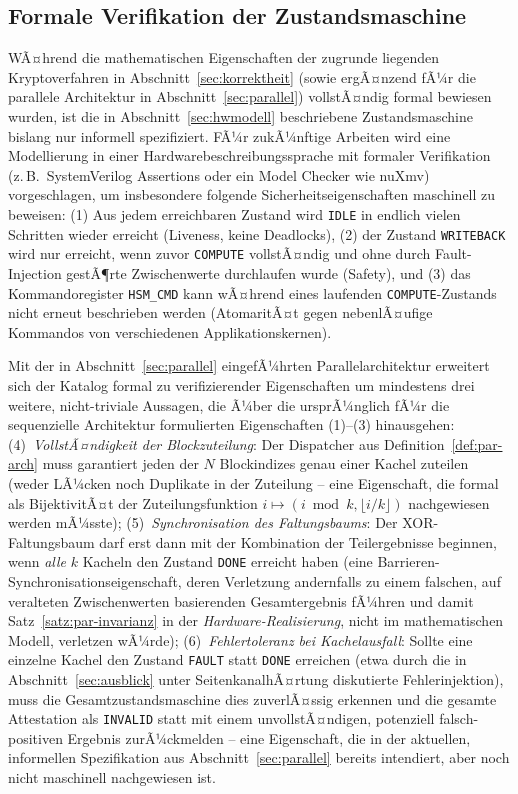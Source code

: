 ﻿\documentclass[a4paper,12pt]{article}
\theoremstyle{definition}
\begin{document}
\subsection{Formale Verifikation der Zustandsmaschine}

WÃ¤hrend die mathematischen Eigenschaften der zugrunde liegenden Kryptoverfahren in Abschnitt~\ref{sec:korrektheit} (sowie ergÃ¤nzend fÃ¼r die parallele Architektur in Abschnitt~\ref{sec:parallel}) vollstÃ¤ndig formal bewiesen wurden, ist die in Abschnitt~\ref{sec:hwmodell} beschriebene Zustandsmaschine bislang nur informell spezifiziert. FÃ¼r zukÃ¼nftige Arbeiten wird eine Modellierung in einer Hardwarebeschreibungssprache mit formaler Verifikation (z.\,B.\ SystemVerilog Assertions oder ein Model Checker wie nuXmv) vorgeschlagen, um insbesondere folgende Sicherheitseigenschaften maschinell zu beweisen: (1) Aus jedem erreichbaren Zustand wird \texttt{IDLE} in endlich vielen Schritten wieder erreicht (Liveness, keine Deadlocks), (2) der Zustand \texttt{WRITEBACK} wird nur erreicht, wenn zuvor \texttt{COMPUTE} vollstÃ¤ndig und ohne durch Fault-Injection gestÃ¶rte Zwischenwerte durchlaufen wurde (Safety), und (3) das Kommandoregister \texttt{HSM\_CMD} kann wÃ¤hrend eines laufenden \texttt{COMPUTE}-Zustands nicht erneut beschrieben werden (AtomaritÃ¤t gegen nebenlÃ¤ufige Kommandos von verschiedenen Applikationskernen).

Mit der in Abschnitt~\ref{sec:parallel} eingefÃ¼hrten Parallelarchitektur erweitert sich der Katalog formal zu verifizierender Eigenschaften um mindestens drei weitere, nicht-triviale Aussagen, die Ã¼ber die ursprÃ¼nglich fÃ¼r die sequenzielle Architektur formulierten Eigenschaften (1)--(3) hinausgehen: (4)~\emph{VollstÃ¤ndigkeit der Blockzuteilung}: Der Dispatcher aus Definition~\ref{def:par-arch} muss garantiert jeden der $N$ Blockindizes genau einer Kachel zuteilen (weder LÃ¼cken noch Duplikate in der Zuteilung -- eine Eigenschaft, die formal als BijektivitÃ¤t der Zuteilungsfunktion $i \mapsto (i \bmod k, \lfloor i/k\rfloor)$ nachgewiesen werden mÃ¼sste); (5)~\emph{Synchronisation des Faltungsbaums}: Der XOR-Faltungsbaum darf erst dann mit der Kombination der Teilergebnisse beginnen, wenn \emph{alle} $k$ Kacheln den Zustand \texttt{DONE} erreicht haben (eine Barrieren-Synchronisationseigenschaft, deren Verletzung andernfalls zu einem falschen, auf veralteten Zwischenwerten basierenden Gesamtergebnis fÃ¼hren und damit Satz~\ref{satz:par-invarianz} in der \emph{Hardware-Realisierung}, nicht im mathematischen Modell, verletzen wÃ¼rde); (6)~\emph{Fehlertoleranz bei Kachelausfall}: Sollte eine einzelne Kachel den Zustand \texttt{FAULT} statt \texttt{DONE} erreichen (etwa durch die in Abschnitt~\ref{sec:ausblick} unter SeitenkanalhÃ¤rtung diskutierte Fehlerinjektion), muss die Gesamtzustandsmaschine dies zuverlÃ¤ssig erkennen und die gesamte Attestation als \texttt{INVALID} statt mit einem unvollstÃ¤ndigen, potenziell falsch-positiven Ergebnis zurÃ¼ckmelden -- eine Eigenschaft, die in der aktuellen, informellen Spezifikation aus Abschnitt~\ref{sec:parallel} bereits intendiert, aber noch nicht maschinell nachgewiesen ist.
\end{document}
